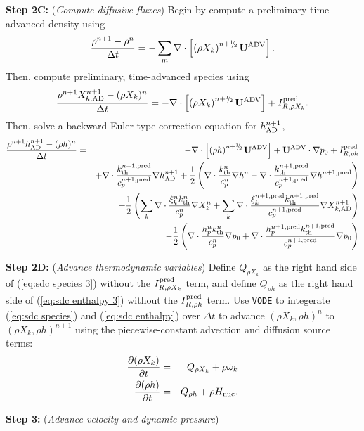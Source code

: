 {\bf Step 2C:} ({\it Compute diffusive fluxes}) Begin by compute a preliminary time-advanced density using
\begin{equation}
\frac{\rho^{n+1} - \rho^n}{\Delta t} = -\sum_m\nabla\cdot\left[\left(\rho X_k\right)^{n+\myhalf}\uadvsdc\right].
\end{equation}
Then, compute preliminary, time-advanced species using
\begin{equation}
\frac{\rho^{n+1}X_{k,{\rm AD}}^{n+1} - (\rho X_k)^n}{\Delta t} = -\nabla\cdot\left[\left(\rho X_k\right)^{n+\myhalf}\uadvsdc\right] + I_{R,\rho X_k}^{\rm pred}.\label{eq:sdc species 3}
\end{equation}
Then, solve a backward-Euler-type correction equation for $h^{n+1}_{\rm AD}$,
\begin{eqnarray}
\frac{\rho^{n+1}h^{n+1}_{\rm AD} - (\rho h)^n}{\Delta t} &=& -\nabla\cdot\left[\left(\rho h\right)^{n+\myhalf}\uadvsdc\right] + \uadvsdc\cdot\nabla p_0 + I_{R,\rho h}^{\rm pred}\nonumber\\
&& + \nabla\cdot\frac{\kth^{n+1,{\rm pred}}}{c_p^{n+1,{\rm pred}}}\nabla h^{n+1}_{\rm AD} + \half\left(\nabla\cdot\frac{\kth^n}{c_p^n}\nabla h^n - \nabla\cdot\frac{\kth^{n+1,{\rm pred}}}{c_p^{n+1,{\rm pred}}}\nabla h^{n+1,{\rm pred}}\right)\nonumber\\
&& + \half\left(\sum_k\nabla\cdot\frac{\xi_k^n k_{\rm th}^n}{c_p^n}\nabla X_k^n + \sum_k\nabla\cdot\frac{\xi_k^{n+1,{\rm pred}} k_{\rm th}^{n+1,{\rm pred}}}{c_p^{n+1,{\rm pred}}}\nabla X_{k,{\rm AD}}^{n+1}\right)\nonumber\\
&& - \half\left(\nabla\cdot\frac{h_p^n k_{\rm th}^n}{c_p^n}\nabla p_0 + \nabla\cdot\frac{h_p^{n+1,{\rm pred}}k_{\rm th}^{n+1,{\rm pred}}}{c_p^{n+1,{\rm pred}}}\nabla p_0\right)\label{eq:sdc enthalpy 3}
\end{eqnarray}

{\bf Step 2D:} ({\it Advance thermodynamic variables}) Define $Q_{\rho X_k}$ as the right hand side of (\ref{eq:sdc species 3}) without the $I_{R,\rho X_k}^{\rm pred}$ term, and define $Q_{\rho h}$ as the right hand side of (\ref{eq:sdc enthalpy 3}) without the $I_{R,\rho h}^{\rm pred}$ term.  Use {\tt VODE} to integerate (\ref{eq:sdc species}) and (\ref{eq:sdc enthalpy}) over $\Delta t$ to advance $(\rho X_k, \rho h)^n$ to $(\rho X_k, \rho h)^{n+1}$ using the piecewise-constant advection and diffusion source terms:
\begin{eqnarray}
\frac{\partial(\rho X_k)}{\partial t} &=& Q_{\rho X_k} + \rho\dot\omega_k\\
\frac{\partial(\rho h)}{\partial t} &=& Q_{\rho h} + \rho{H_{\rm nuc}}.
\end{eqnarray}

{\bf Step 3:} ({\it Advance velocity and dynamic pressure})\\

